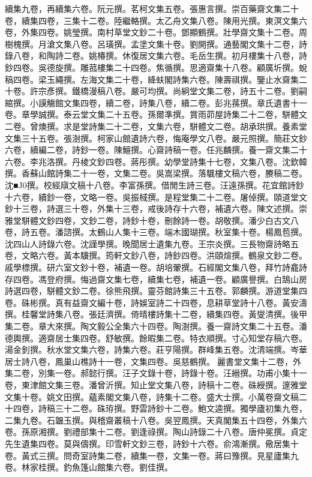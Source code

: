 \begin{pinyinscope}
續集九卷，再續集六卷。阮元撰。茗柯文集五卷。張惠言撰。崇百藥齋文集二十卷，續集四卷，三集十二卷。陸繼輅撰。太乙舟文集八卷。陳用光撰。東溟文集六卷，外集四卷。姚瑩撰。南村草堂文鈔二十卷。鄧顯鶴撰。壯學齋文集十二卷。周樹槐撰。月滄文集八卷。呂璜撰。孟塗文集十卷。劉開撰。通藝閣文集十二卷，詩錄八卷，和陶詩二卷。姚椿撰。休復居文集六卷。毛岳生撰。初月樓集十八卷，詩鈔四卷。吳德旋撰。雕菰樓集二十四卷。焦循撰。思適齋集十八卷。顧廣圻撰。蛻稿四卷。梁玉繩撰。左海文集二十卷，絳蚨閣詩集六卷。陳壽祺撰。鑒止水齋集二十卷。許宗彥撰。鐵橋漫稿八卷。嚴可均撰。尚絅堂文集二卷，詩五十二卷。劉嗣綰撰。小謨觴館文集四卷，續二卷，詩集八卷，續二卷。彭兆蓀撰。章氏遺書十一卷。章學誠撰。泰云堂文集二十五卷。孫爾準撰。賞雨茆屋詩集二十二卷，駢體文二卷。曾燠撰。求是堂詩集二十二卷，文集六卷，駢體文二卷。胡承珙撰。養素堂文集三十五卷。張澍撰。柯家山館遺詩六卷，悔庵學文八卷。嚴元照撰。簡莊文鈔六卷，續編二卷，詩鈔一卷。陳鱣撰。心齋詩稿一卷。任兆麟撰。養一齋文集二十六卷。李兆洛撰。丹棱文鈔四卷。蔣彤撰。幼學堂詩集十七卷，文集八卷。沈欽韓撰。香蘇山館詩集二十一卷，文集二卷。吳嵩梁撰。落颿樓文稿六卷，賸稿二卷。沈■J0撰。校經廎文稿十八卷。李富孫撰。借閒生詩三卷。汪遠孫撰。花宜館詩鈔十六卷，續鈔一卷，文略一卷。吳振棫撰。是程堂集二十二卷。屠倬撰。頤道堂文鈔十三卷，詩選三十卷，外集十三卷，戒後詩存十六卷，補遺六卷。陳文述撰。崇雅堂駢體文鈔四卷，文鈔二卷，詩鈔十卷，刪餘詩一卷。胡敬撰。潘少白古文八卷，詩五卷。潘諮撰。太鶴山人集十三卷。端木國瑚撰。秋室集十卷。楊鳳苞撰。沈四山人詩錄六卷。沈謹學撰。晚聞居士遺集九卷。王宗炎撰。三長物齋詩略五卷，文略六卷。黃本驥撰。筠軒文鈔八卷，詩鈔四卷。洪頤煊撰。鶴泉文鈔二卷。戚學標撰。研六室文鈔十卷，補遺一卷。胡培翬撰。石經閣文集八卷，拜竹詩龕詩存四卷。馮登府撰。悔過齋文集七卷，續集七卷，補遺一卷。顧廣譽撰。白鵠山房詩選四卷，駢體文鈔二卷。徐熊飛撰。靈芬館詩集三十五卷。郭麟撰。游道堂集四卷。硃彬撰。真有益齋文編十卷，詩娛室詩二十四卷，息耕草堂詩十八卷。黃安濤撰。桂馨堂詩集八卷。張廷濟撰。倚晴樓詩集十二卷，續集四卷。黃燮清撰。後甲集二卷。章大來撰。陶文毅公全集六十四卷。陶澍撰。養一齋詩文集二十五卷。潘德輿撰。適齋居士集四卷。舒敏撰。餘暇集二卷。特衣順撰。寸心知堂存稿六卷。湯金釗撰。秋水堂文集六卷，詩集六卷。莊亨陽撰。群峰集五卷。沈清端撰。岑華居士詩八卷，鳳巢山樵詩十一卷，文集四卷。吳慈鶴撰。麗書堂文集十二卷，外集二卷，別集一卷。郝懿行撰。汪子文錄十卷，詩錄十卷。汪縉撰。功甫小集十一卷，東津館文集三卷。潘曾沂撰。知止堂文集八卷，詩稿十二卷。硃綬撰。邃雅堂文集十卷。姚文田撰。蘊素閣文集八卷，詩集十二卷。盛大士撰。小萬卷齋文稿二十四卷，詩稿三十二卷。硃珔撰。野雲詩鈔十二卷。鮑文逵撰。獨學廬初集九卷，二集九卷。石韞玉撰。與稽齋叢稿十八卷。吳翌鳳撰。天真閣集五十四卷，外集六卷。孫原湘撰。劉禮部集十二卷。劉逢祿撰。陶山詩錄二十八卷。唐仲冕撰。貞定先生遺集四卷。莫與儔撰。印雪軒文鈔三卷，詩鈔十六卷。俞鴻漸撰。儆居集十卷。黃式三撰。問奇室詩集二卷，續集一卷，文集一卷。蔣曰豫撰。見星廬集九卷。林家桂撰。釣魚篷山館集六卷。劉佳撰。


\end{pinyinscope}
